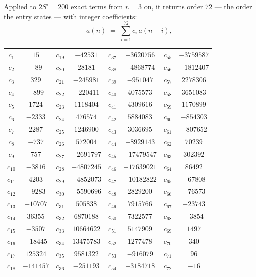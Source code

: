 \documentclass[11pt,a4paper]{article}
\theoremstyle{plain}
\theoremstyle{definition}
\begin{document}
Applied to $2S'=200$ exact terms from $n=3$ on, it returns order $72$ --- the
order the entry states --- with integer coefficients:
\[
a(n)\;=\;\sum_{i=1}^{72}c_i\,a(n-i),
\]
\begin{center}\small
\begin{tabular}{cccccccc}
$c_{1}$ & $15$ & $c_{19}$ & $-42531$ & $c_{37}$ & $-3620756$ & $c_{55}$ & $-3759587$ \\
$c_{2}$ & $-89$ & $c_{20}$ & $28181$ & $c_{38}$ & $-4868774$ & $c_{56}$ & $-1812407$ \\
$c_{3}$ & $329$ & $c_{21}$ & $-245981$ & $c_{39}$ & $-951047$ & $c_{57}$ & $2278306$ \\
$c_{4}$ & $-899$ & $c_{22}$ & $-220411$ & $c_{40}$ & $4075573$ & $c_{58}$ & $3651083$ \\
$c_{5}$ & $1724$ & $c_{23}$ & $1118404$ & $c_{41}$ & $4309616$ & $c_{59}$ & $1170899$ \\
$c_{6}$ & $-2333$ & $c_{24}$ & $476574$ & $c_{42}$ & $5884083$ & $c_{60}$ & $-854303$ \\
$c_{7}$ & $2287$ & $c_{25}$ & $1246900$ & $c_{43}$ & $3036695$ & $c_{61}$ & $-807652$ \\
$c_{8}$ & $-737$ & $c_{26}$ & $572004$ & $c_{44}$ & $-8929143$ & $c_{62}$ & $70239$ \\
$c_{9}$ & $757$ & $c_{27}$ & $-2691797$ & $c_{45}$ & $-17479547$ & $c_{63}$ & $302392$ \\
$c_{10}$ & $-3816$ & $c_{28}$ & $-4807245$ & $c_{46}$ & $-17639021$ & $c_{64}$ & $86492$ \\
$c_{11}$ & $4203$ & $c_{29}$ & $-4852073$ & $c_{47}$ & $-10182822$ & $c_{65}$ & $-67808$ \\
$c_{12}$ & $-9283$ & $c_{30}$ & $-5590696$ & $c_{48}$ & $2829200$ & $c_{66}$ & $-76573$ \\
$c_{13}$ & $-10707$ & $c_{31}$ & $505838$ & $c_{49}$ & $7915766$ & $c_{67}$ & $-23743$ \\
$c_{14}$ & $36355$ & $c_{32}$ & $6870188$ & $c_{50}$ & $7322577$ & $c_{68}$ & $-3854$ \\
$c_{15}$ & $-3507$ & $c_{33}$ & $10664622$ & $c_{51}$ & $5147909$ & $c_{69}$ & $1497$ \\
$c_{16}$ & $-18445$ & $c_{34}$ & $13475783$ & $c_{52}$ & $1277478$ & $c_{70}$ & $340$ \\
$c_{17}$ & $125324$ & $c_{35}$ & $9581322$ & $c_{53}$ & $-916079$ & $c_{71}$ & $96$ \\
$c_{18}$ & $-141457$ & $c_{36}$ & $-251193$ & $c_{54}$ & $-3184718$ & $c_{72}$ & $-16$ \\
\end{tabular}
\end{center}
\end{document}
